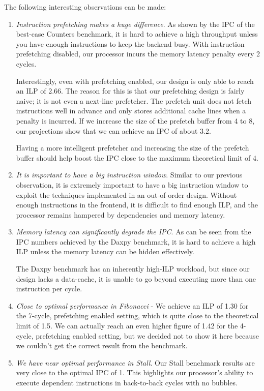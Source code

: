 \documentclass{article}
\begin{document}
The following interesting observations can be made:
\begin{enumerate}
    \item \textit{Instruction prefetching makes a huge difference}. As shown by
        the IPC of the best-case Counters benchmark, it is hard to achieve a
        high throughput unless you have enough instructions to keep the backend
        busy. With instruction prefetching disabled, our processor incurs the
        memory latency penalty every 2 cycles.

        Interestingly, even with prefetching enabled, our design is only able
        to reach an ILP of 2.66. The reason for this is that our prefetching
        design is fairly naive; it is not even a next-line prefetcher. The
        prefetch unit does not fetch instructions well in advance and only
        stores additional cache lines when a penalty is incurred. If we
        increase the size of the prefetch buffer from 4 to 8, our projections
        show that we can achieve an IPC of about 3.2.

        Having a more intelligent prefetcher and increasing the size of the
        prefetch buffer should help boost the IPC close to the maximum
        theoretical limit of 4.

    \item \textit{It is important to have a big instruction window}. Similar to
        our previous observation, it is extremely important to have a big
        instruction window to exploit the techniques implemented in an
        out-of-order design. Without enough instructions in the frontend, it is
        difficult to find enough ILP, and the processor remains hampered by
        dependencies and memory latency.

    \item \textit{Memory latency can significantly degrade the IPC}. As can be
        seen from the IPC numbers achieved by the Daxpy benchmark, it is hard to
        achieve a high ILP unless the memory latency can be hidden effectively.

        The Daxpy benchmark has an inherently high-ILP workload, but since our
        design lacks a data-cache, it is unable to go beyond executing more than
        one instruction per cycle.

    \item \textit{Close to optimal performance in Fibonacci} - We achieve an ILP
        of 1.30 for the 7-cycle, prefetching enabled setting, which is quite
        close to the theoretical limit of 1.5. We can actually reach an even
        higher figure of 1.42 for the 4-cycle, prefetching enabled setting, but
        we decided not to show it here because we couldn't get the correct
        result from the benchmark.

    \item \textit{We have near optimal performance in Stall}. Our Stall
        benchmark results are very close to the optimal IPC of 1. This
        highlights our processor's ability to execute dependent instructions in
        back-to-back cycles with no bubbles.
\end{enumerate}
\end{document}
